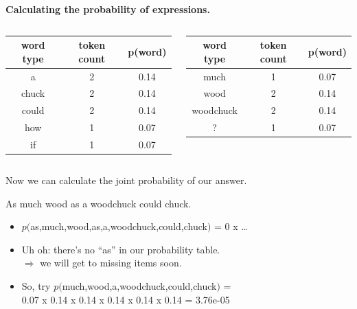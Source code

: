 \documentclass{beamer}
\newcommand{\pagestepalt}[2]{
  \begin{frame}[t]
    \begin{minipage}[t][0.26\textheight][t]{\textwidth}
      \begin{center}
        \huge
        \textbf{#1}
      \end{center}
    \end{minipage}
    
    \begin{minipage}[t][0.7\textheight][c]{\textwidth}
      #2
    \end{minipage}
  \end{frame}
}
\begin{document}
\pagestepalt{Calculating the probability of expressions.}{
  \vspace{-1cm}
  \begin{columns}[T]
    \begin{column}{0.5\textwidth}
      \begin{center}
        \small
        \begin{tabular}{c|c|c}
          word type & token count & \alert{p(word)}\\
          \hline
          a & 2 & 0.14\\
          chuck & 2 & 0.14 \\
          could & 2 & 0.14 \\
          how & 1 & 0.07\\
          if & 1 & 0.07 \\
        \end{tabular}
      \end{center}
    \end{column}
    \begin{column}{0.5\textwidth}
      \begin{center}
        \small
        \begin{tabular}{c|c|c}
          word type & token count & \alert{p(word)} \\
          \hline
          much & 1 & 0.07\\
          wood & 2 & 0.14 \\
          woodchuck  &2 & 0.14 \\
          ? & 1 & 0.07 \\
        \end{tabular}
      \end{center}
    \end{column}
  \end{columns}
  Now we can calculate the joint probability of our answer.
  \begin{center}
    \Large As much wood as a woodchuck could chuck. 
  \end{center}
  \begin{itemize}
  \item $p($as,much,wood,as,a,woodchuck,could,chuck$)$ = \pause \alert{0 x \ldots}\pause
  \item Uh oh: there's no ``as'' in our probability table. \\
    $\Rightarrow$ we will get to missing items soon.\pause
  \item So, try $p($much,wood,a,woodchuck,could,chuck$)$ = \\ \pause \alert{0.07 x 0.14 x 0.14 x 0.14 x 0.14 x 0.14  = 3.76e-05}
  \end{itemize}
}
\end{document}
